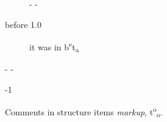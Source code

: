 \begin{description}\kern-\topsep
\makeatletter\advance\@topsepadd-\topsep\makeatother%
\item[before 1.0]{it was in b\textsuperscript{e}t\textsubscript{a}

}\end{description}%
\begin{description}\kern-\topsep
\makeatletter\advance\@topsepadd-\topsep\makeatother%
\item[version]{-1}\end{description}%
\label{cpage-test+u+package+++ml-module-Markup-val-foo}\begin{ocamlindent}Comments in structure items  \emph{markup}, t\textsuperscript{o}\textsubscript{o}.\end{ocamlindent}%
\medbreak


